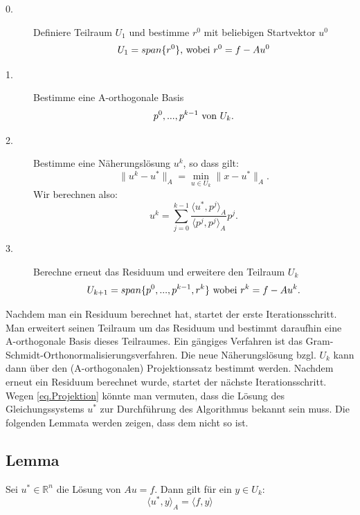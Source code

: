 \begin{description}

\item[0.] Definiere Teilraum $U_{1}$ und bestimme $r^{0}$ mit beliebigen Startvektor $u^{0}$
\begin{equation}
U_{1} = span\{r^{0}\} \textnormal{, wobei } r^{0} = f - Au^{0}
\end{equation}

\item[1.] Bestimme eine A-orthogonale Basis
\begin{equation}
p^{0},...,p^{k-1} \textnormal{ von } U_{k}.
\end{equation}

\item[2.] Bestimme eine Näherungslösung $u^{k}$, so dass gilt:
\begin{equation}
\|u^{k} - u^{*}\|_{A} = \underset{u \in U_{k}}{\min} \|x - u^{*}\|_{A}.
\end{equation}
Wir berechnen also:
\begin{equation}
u^{k} = \sum_{j=0}^{k-1} \frac {\langle u^{*}, p^{j} \rangle _{A}} {\langle p^{j}, p^{j} \rangle _{A}} p^{j}.\label{eq.Projektion}
\end{equation}

\item[3.] Berechne erneut das Residuum und erweitere den Teilraum $U_{k}$
\begin{equation}
U_{k+1} = span\{p^{0},...,p^{k-1},r^{k}\} \textnormal{ wobei } r^{k} = f - Au^{k}.
\end{equation}

\end{description}

Nachdem man ein Residuum berechnet hat, startet der erste Iterationsschritt. Man erweitert seinen Teilraum um das Residuum und bestimmt daraufhin eine A-orthogonale Basis dieses Teilraumes. Ein gängiges Verfahren ist das Gram-Schmidt-Orthonormalisierungsverfahren. Die neue Näherungslösung bzgl. $U_{k}$ kann dann über den (A-orthogonalen) Projektionssatz bestimmt werden. Nachdem erneut ein Residuum berechnet wurde, startet der nächste Iterationsschritt.\\
Wegen \autoref{eq.Projektion} könnte man vermuten, dass die Lösung des Gleichungssystems $u^{*}$ zur Durchführung des Algorithmus bekannt sein muss. Die folgenden Lemmata werden zeigen, dass dem nicht so ist.

\subsection{Lemma}
Sei $u^{*} \in \mathbb{R}^{n}$ die Lösung von $Au = f$. Dann gilt für ein $y \in U_{k}$:
\begin{equation}
\langle u^{*}, y \rangle _{A} = \langle f, y \rangle
\end{equation}

